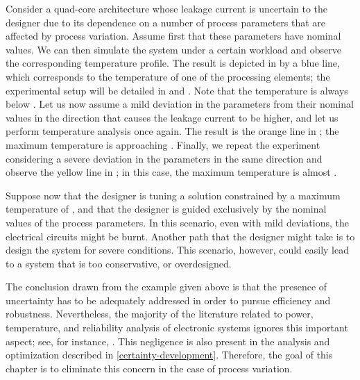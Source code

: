 Consider a quad-core architecture whose leakage current is uncertain to the
designer due to its dependence on a number of process parameters that are
affected by process variation. Assume first that these parameters have nominal
values. We can then simulate the system under a certain workload and observe the
corresponding temperature profile. The result is depicted in
 by a blue line, which corresponds to the temperature of
one of the processing elements; the experimental setup will be detailed in
 and . Note that
the temperature is always below . Let us now assume a mild deviation
in the parameters from their nominal values in the direction that causes the
leakage current to be higher, and let us perform temperature analysis once
again. The result is the orange line in ; the maximum
temperature is approaching . Finally, we repeat the experiment
considering a severe deviation in the parameters in the same direction and
observe the yellow line in ; in this case, the maximum
temperature is almost .

Suppose now that the designer is tuning a solution constrained by a maximum
temperature of , and that the designer is guided exclusively by the
nominal values of the process parameters. In this scenario, even with mild
deviations, the electrical circuits might be burnt. Another path that the
designer might take is to design the system for severe conditions. This
scenario, however, could easily lead to a system that is too conservative, or
overdesigned.

The conclusion drawn from the example given above is that the presence of
uncertainty has to be adequately addressed in order to pursue efficiency and
robustness. Nevertheless, the majority of the literature related to power,
temperature, and reliability analysis of electronic systems ignores this
important aspect; see, for instance, \cite{rao2009, yang2010, rai2011,
thiele2011, pagani2014}. This negligence is also present in the analysis and
optimization described in \cref{certainty-development}. Therefore, the goal of
this chapter is to eliminate this concern in the case of process variation.
